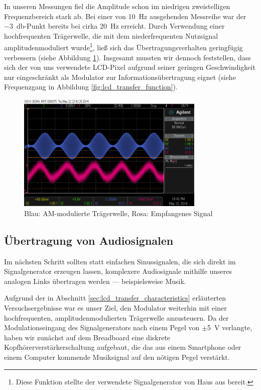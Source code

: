 \documentclass[12pt,a4paper]{article}
\begin{document}
In unseren Messungen fiel die Amplitude schon im niedrigen zweistelligen Frequenzbereich stark ab. Bei einer von \SI{10}{\hertz} ausgehenden Messreihe war der \SI{-3}{\decibel}-Punkt bereits bei cirka \SI{20}{\hertz} erreicht. Durch Verwendung einer hochfrequenten Trägerwelle, die mit dem niederfrequenten Nutzsignal amplitudenmoduliert wurde\footnote{Diese Funktion stellte der verwendete Signalgenerator von Haus aus bereit.}, ließ sich das Übertragungsverhalten geringfügig verbessern (siehe Abbildung \ref{fig:amplitude_modulation}). Insgesamt mussten wir dennoch feststellen, dass sich der von uns verwendete LCD-Pixel aufgrund seiner geringen Geschwindigkeit nur eingeschränkt als Modulator zur Informationsübertragung eignet (siehe Frequenzgang in Abbildung \ref{fig:lcd_transfer_function}).

\begin{figure}[H]
  \centering
    \includegraphics[width=0.8\textwidth]{../measurements/20140522_sweep/scope_1.png}
  \caption{Blau: AM-modulierte Trägerwelle, Rosa: Empfangenes Signal}
  \label{fig:amplitude_modulation}
\end{figure}


\subsection{Übertragung von Audiosignalen}

Im nächsten Schritt sollten statt einfachen Sinussignalen, die sich direkt im Signalgenerator erzeugen lassen, komplexere Audiosignale mithilfe unseres analogen Links übertragen werden --- beispielsweise Musik.

Aufgrund der in Abschnitt \ref{sec:lcd_transfer_characteristics} erläuterten Versuchsergebnisse war es unser Ziel, den Modulator weiterhin mit einer hochfrequenten, amplitudenmodulierten Trägerwelle anzusteuern. Da der Modulationseingang des Signalgenerators nach einem Pegel von $\pm$\SI{5}{\volt} verlangte, haben wir zunächst auf dem Breadboard eine diskrete Kopfhörerverstärkerschaltung aufgebaut, die das aus einem Smartphone oder einem Computer kommende Musiksignal auf den nötigen Pegel verstärkt.
\end{document}
